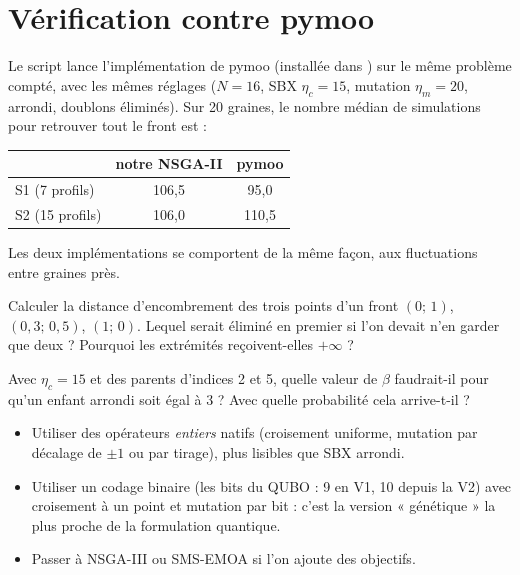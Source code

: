\section{Vérification contre pymoo}
Le script  lance l'implémentation de pymoo (installée dans ) sur le même problème compté, avec les mêmes réglages ($N=16$, SBX $\eta_c=15$, mutation $\eta_m=20$, arrondi, doublons éliminés). Sur 20 graines, le nombre médian de simulations pour retrouver tout le front est :
\begin{center}
\begin{tabular}{lcc}
\toprule
 & notre NSGA-II & pymoo \\
\midrule
S1 (7 profils) & 106,5 & 95,0 \\
S2 (15 profils) & 106,0 & 110,5 \\
\bottomrule
\end{tabular}
\end{center}
Les deux implémentations se comportent de la même façon, aux fluctuations entre graines près.

\exercices
\begin{exercice}
Calculer la distance d'encombrement des trois points d'un front $(0;\,1)$, $(0{,}3;\,0{,}5)$, $(1;\,0)$. Lequel serait éliminé en premier si l'on devait n'en garder que deux ? Pourquoi les extrémités reçoivent-elles $+\infty$ ?
\end{exercice}
\begin{exercice}
Avec $\eta_c=15$ et des parents d'indices 2 et 5, quelle valeur de $\beta$ faudrait-il pour qu'un enfant arrondi soit égal à 3 ? Avec quelle probabilité cela arrive-t-il ?
\end{exercice}

\begin{pistes}
\begin{itemize}
\item Utiliser des opérateurs \emph{entiers} natifs (croisement uniforme, mutation par décalage de $\pm1$ ou par tirage), plus lisibles que SBX arrondi.
\item Utiliser un codage binaire (les bits du QUBO : 9 en V1, 10 depuis la V2) avec croisement à un point et mutation par bit : c'est la version « génétique » la plus proche de la formulation quantique.
\item Passer à NSGA-III ou SMS-EMOA si l'on ajoute des objectifs.
\end{itemize}
\end{pistes}
